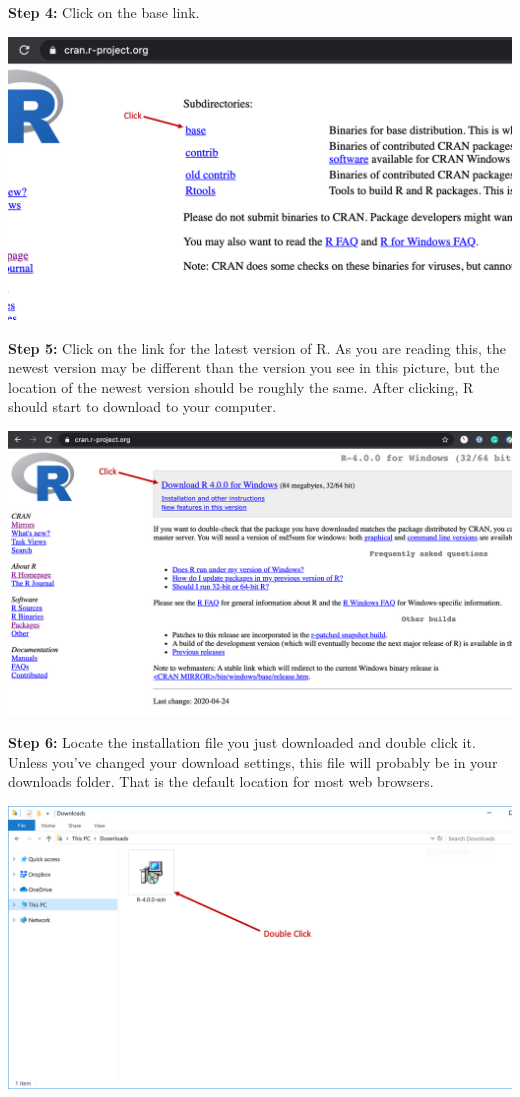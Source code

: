 \documentclass[
  letterpaper,
  DIV=11,
  numbers=noendperiod]{scrreprt}
\begin{document}
\textbf{Step 4:} Click on the base link.

\includegraphics{chapters/installing_r_and_rstudio/pc_download_r2.png}

\textbf{Step 5:} Click on the link for the latest version of R. As you
are reading this, the newest version may be different than the version
you see in this picture, but the location of the newest version should
be roughly the same. After clicking, R should start to download to your
computer.

\includegraphics{chapters/installing_r_and_rstudio/pc_download_r3.png}

\textbf{Step 6:} Locate the installation file you just downloaded and
double click it. Unless you've changed your download settings, this file
will probably be in your downloads folder. That is the default location
for most web browsers.

\includegraphics{chapters/installing_r_and_rstudio/pc_install_r1.png}
\end{document}

